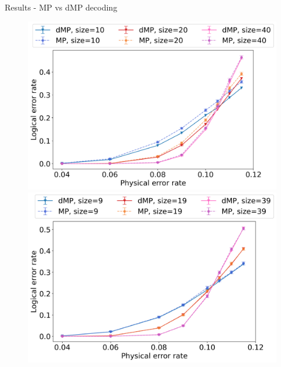 \documentclass{dfki}
\begin{document}
\begin{frame}{Results - MP vs dMP decoding}
	\begin{figure}[h!]
		\centering
		\begin{minipage}{0.45\textwidth}
			\centering
			\includegraphics[width=\textwidth]{fig/dMP_vs_MP_even.png}
		\end{minipage} \hfill
		\pause
		\begin{minipage}{0.45\textwidth}
			\centering
			\includegraphics[width=\textwidth]{fig/dMP_vs_MP_odd.png}
		\end{minipage}
	\end{figure}
\end{frame}
\end{document}
